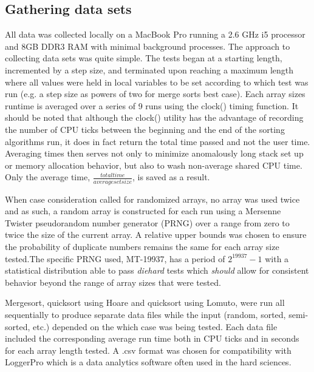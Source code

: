\documentclass[11pt,letterpaper]{report}
\begin{document}
\subsection*{Gathering data sets}

All data was collected locally on a MacBook Pro running a 2.6 GHz i5 processor and 8GB DDR3 RAM with minimal background processes. The approach to collecting data sets was quite simple. The tests began at a starting length, incremented by a step size, and terminated upon reaching a maximum length where all values were held in local variables to be set according to which test was run (e.g. a step size as powers of two for merge sorts best case). Each array sizes runtime is averaged over a series of 9 runs using the clock() timing function. It should be noted that although the clock() utility has the advantage of recording the number of CPU ticks between the beginning and the end of the sorting algorithms run, it does in fact return the total time passed and not the user time. Averaging times then serves not only to minimize anomalously long stack set up or memory allocation behavior, but also to wash non-average shared CPU time. Only the average time, $\frac{total time}{average set size}$, is saved as a result. 

When case consideration called for randomized arrays, no array was used twice and as such, a random array is constructed for each run using a Mersenne Twister pseudorandom number generator (PRNG) over a range from zero to twice the size of the current array. A relative upper bounds was chosen to ensure the probability of duplicate numbers remains the same for each array size tested.The specific PRNG used, MT-19937, has a period of $2^{19937}-1$ with a statistical distribution able to pass \emph{diehard} tests which \emph{should} allow for consistent behavior beyond the range of array sizes that were tested.

Mergesort, quicksort using Hoare and quicksort using Lomuto, were run all sequentially to produce separate data files while the input (random, sorted, semi-sorted, etc.) depended on the which case was being tested. Each data file included the corresponding average run time both in CPU ticks and in seconds for each array length tested. A .csv format was chosen for compatibility with LoggerPro which is a data analytics software often used in the hard sciences.
\end{document}
